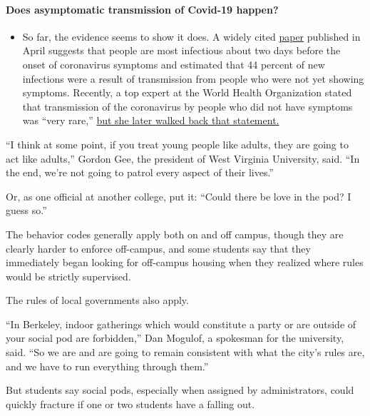 \begin{itemize}
{  \paragraph{Does asymptomatic transmission of Covid-19
  happen?}\label{does-asymptomatic-transmission-of-covid-19-happen}}

  \begin{itemize}
  \tightlist
  \item
    So far, the evidence seems to show it does. A widely cited
    \href{https://www.nature.com/articles/s41591-020-0869-5}{paper}
    published in April suggests that people are most infectious about
    two days before the onset of coronavirus symptoms and estimated that
    44 percent of new infections were a result of transmission from
    people who were not yet showing symptoms. Recently, a top expert at
    the World Health Organization stated that transmission of the
    coronavirus by people who did not have symptoms was ``very rare,''
    \href{https://www.nytimes.com/2020/06/09/world/coronavirus-updates.html?action=click\&pgtype=Article\&state=default\&region=MAIN_CONTENT_3\&context=storylines_faq\#link-1f302e21}{but
    she later walked back that statement.}
  \end{itemize}
\end{itemize}

``I think at some point, if you treat young people like adults, they are
going to act like adults,'' Gordon Gee, the president of West Virginia
University, said. ``In the end, we're not going to patrol every aspect
of their lives.''

Or, as one official at another college, put it: ``Could there be love in
the pod? I guess so.''

The behavior codes generally apply both on and off campus, though they
are clearly harder to enforce off-campus, and some students say that
they immediately began looking for off-campus housing when they realized
where rules would be strictly supervised.

The rules of local governments also apply.

``In Berkeley, indoor gatherings which would constitute a party or are
outside of your social pod are forbidden,'' Dan Mogulof, a spokesman for
the university, said. ``So we are and are going to remain consistent
with what the city's rules are, and we have to run everything through
them.''

But students say social pods, especially when assigned by
administrators, could quickly fracture if one or two students have a
falling out.

